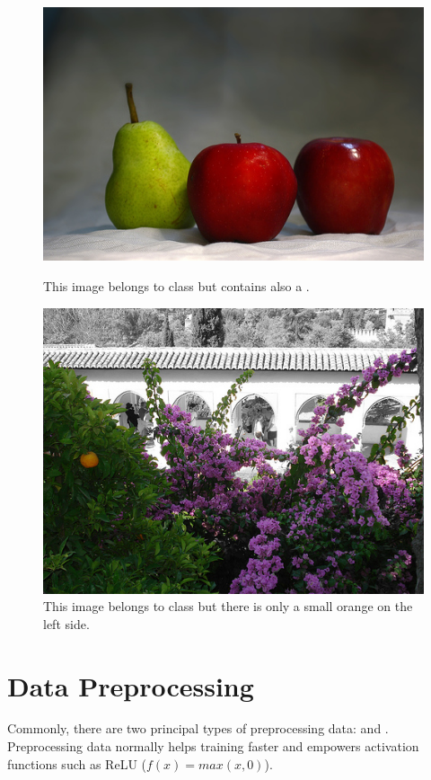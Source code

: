 \begin{figure}[!ht]
	\centering
	\begin{minipage}[t]{0.45\linewidth}
		\includegraphics[scale=0.37]{./figures/imhard1}
		\caption{This image belongs to class  but contains also a .}
		\label{fig:imhard1}
	\end{minipage}
	\quad
	\begin{minipage}[t]{0.45\linewidth}
		\includegraphics[scale=0.35]{./figures/imhard2}
		\caption{This image belongs to class  but there is only a small orange on the left side.}
		\label{fig:imhard2}
	\end{minipage}
\end{figure}

\section{Data Preprocessing}
Commonly, there are two principal types of preprocessing data:  and . Preprocessing data normally helps training faster and empowers activation functions such as ReLU ($f(x) = max(x, 0)$).

